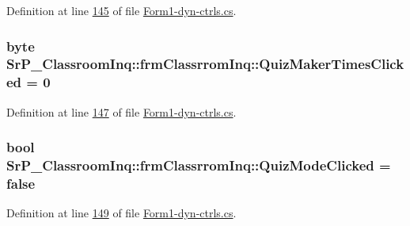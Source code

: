 \-Definition at line \hyperlink{_form1-dyn-ctrls_8cs_source_l00145}{145} of file \hyperlink{_form1-dyn-ctrls_8cs_source}{\-Form1-\/dyn-\/ctrls.\-cs}.

\hypertarget{class_sr_p___classroom_inq_1_1frm_classrrom_inq_ae28b52f195f8e33470bb7bbc988ba622}{
\subsubsection[{\-Quiz\-Maker\-Times\-Clicked}]{\setlength{\rightskip}{0pt plus 5cm}byte {\bf \-Sr\-P\-\_\-\-Classroom\-Inq\-::frm\-Classrrom\-Inq\-::\-Quiz\-Maker\-Times\-Clicked} = 0}}
\label{class_sr_p___classroom_inq_1_1frm_classrrom_inq_ae28b52f195f8e33470bb7bbc988ba622}


\-Definition at line \hyperlink{_form1-dyn-ctrls_8cs_source_l00147}{147} of file \hyperlink{_form1-dyn-ctrls_8cs_source}{\-Form1-\/dyn-\/ctrls.\-cs}.

\hypertarget{class_sr_p___classroom_inq_1_1frm_classrrom_inq_af09c14bf56f313348d1e4a533fe515bf}{
\subsubsection[{\-Quiz\-Mode\-Clicked}]{\setlength{\rightskip}{0pt plus 5cm}bool {\bf \-Sr\-P\-\_\-\-Classroom\-Inq\-::frm\-Classrrom\-Inq\-::\-Quiz\-Mode\-Clicked} = false}}
\label{class_sr_p___classroom_inq_1_1frm_classrrom_inq_af09c14bf56f313348d1e4a533fe515bf}


\-Definition at line \hyperlink{_form1-dyn-ctrls_8cs_source_l00149}{149} of file \hyperlink{_form1-dyn-ctrls_8cs_source}{\-Form1-\/dyn-\/ctrls.\-cs}.

